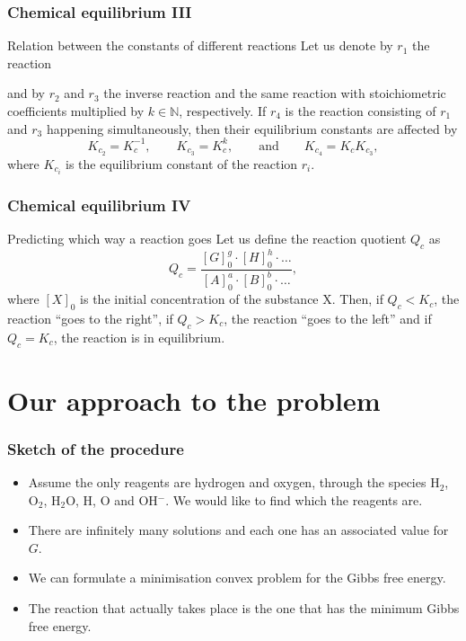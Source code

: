 \documentclass{beamer}
\newcommand{\mN}{{\mathbb N}}
\newcommand{\quotes}[1]{``#1''}
\begin{document}
\begin{frame}
\frametitle{Chemical equilibrium III}
\begin{block}{Relation between the constants of different reactions}
Let us denote by $r_1$ the reaction
\begin{center}
\end{center}
and by $r_2$ and $r_3$ the inverse reaction and the same reaction with stoichiometric coefficients multiplied by $k\in\mN$, respectively. If $r_4$ is the reaction consisting of $r_1$ and $r_3$ happening simultaneously, then their equilibrium constants are affected by
\begin{equation*}
K_{c_{2}} = K_c^{-1}, \qquad K_{c_{3}} = K_c^k, \qquad \text{and} \qquad K_{c_{4}} = K_c K_{c_{3}},
\end{equation*}
where $K_{c_i}$ is the equilibrium constant of the reaction $r_i$.
\end{block}
\end{frame}


\begin{frame}
\frametitle{Chemical equilibrium IV}
\begin{block}{Predicting which way a reaction goes}
Let us define the reaction quotient $Q_c$ as
\begin{equation*}
Q_c= \frac{[G]_0^g\cdot [H]_0^h\cdot\dots}{[A]_0^a\cdot [B]_0^b\cdot\dots},
\end{equation*}
where $[X]_0$ is the initial concentration of the substance X. Then, if $Q_c<K_c$, the reaction \quotes{goes to the right}, if $Q_c>K_c$, the reaction \quotes{goes to the left} and if $Q_c=K_c$, the reaction is in equilibrium.
\end{block}
\end{frame}


\section{Our approach to the problem}


\begin{frame}
\frametitle{Sketch of the procedure}
\begin{itemize}
\item Assume the only reagents are hydrogen and oxygen, through the species H$_2$, O$_2$, H$_2$O, H, O and OH$^-$. We would like to find which the reagents are.
\item There are infinitely many solutions and each one has an associated value for $G$.
\item We can formulate a minimisation convex problem for the Gibbs free energy.
\item The reaction that actually takes place is the one that has the minimum Gibbs free energy.
\end{itemize}
\end{frame}
\end{document}
